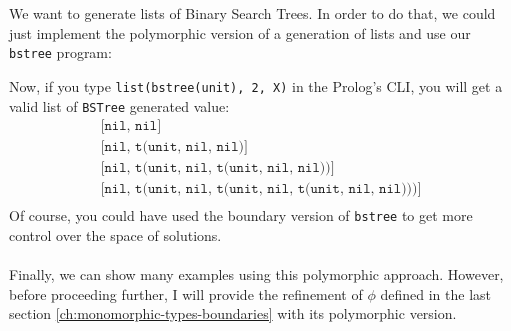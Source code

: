 \documentclass{report}
\theoremstyle{definition}
\theoremstyle{definition}
\newcommand{\ttt}[1]{\texttt{#1}}
\begin{document}
	
	We want to generate lists of Binary Search Trees. In order to do that, we could just implement the polymorphic version of a generation of lists and use our \ttt{bstree} program:
	
	Now, if you type \ttt{list(bstree(unit), 2, X)} in the Prolog's CLI, you will get a valid list of \ttt{BSTree} generated value:
	\begin{align*}
		  & \ttt{[nil, nil]}                                           &   \\
		  & \ttt{[nil, t(unit, nil, nil)]}                             &   \\
		  & \ttt{[nil, t(unit, nil, t(unit, nil, nil))]}               &   \\
		  & \ttt{[nil, t(unit, nil, t(unit, nil, t(unit, nil, nil)))]} &   \\
	\end{align*}
	Of course, you could have used the boundary version of \ttt{bstree} to get more control over the space of solutions.\\\\
	Finally, we can show many examples using this polymorphic approach. However, before proceeding further, I will provide the refinement of $\phi$ defined in the last section \ref{ch:monomorphic-types-boundaries} with its polymorphic version.
\end{document}
